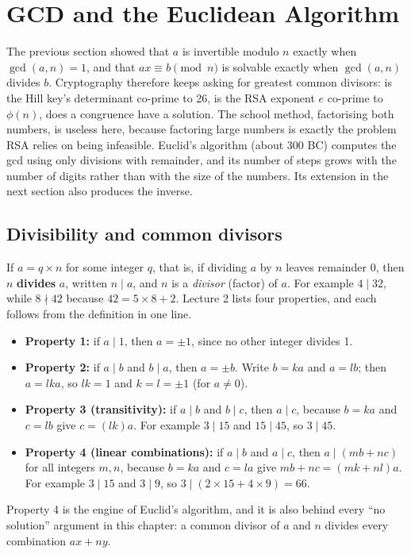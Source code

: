 \section{GCD and the Euclidean Algorithm}\label{sec:gcd}

The previous section showed that $a$ is invertible modulo $n$ exactly when $\gcd(a, n) = 1$, and that $ax \equiv b \pmod n$ is solvable exactly when $\gcd(a, n)$ divides $b$. Cryptography therefore keeps asking for greatest common divisors: is the Hill key's determinant co-prime to 26, is the RSA exponent $e$ co-prime to $\phi(n)$, does a congruence have a solution. The school method, factorising both numbers, is useless here, because factoring large numbers is exactly the problem RSA relies on being infeasible. Euclid's algorithm (about 300 BC) computes the gcd using only divisions with remainder, and its number of steps grows with the number of digits rather than with the size of the numbers. Its extension in the next section also produces the inverse.

\subsection{Divisibility and common divisors}
If $a = q \times n$ for some integer $q$, that is, if dividing $a$ by $n$ leaves remainder 0, then $n$ \textbf{divides} $a$, written $n \mid a$, and $n$ is a \emph{divisor} (factor) of $a$. For example $4 \mid 32$, while $8 \nmid 42$ because $42 = 5 \times 8 + 2$. Lecture 2 lists four properties, and each follows from the definition in one line.
\begin{itemize}[leftmargin=1.5em]
  \item \textbf{Property 1:} if $a \mid 1$, then $a = \pm 1$, since no other integer divides 1.
  \item \textbf{Property 2:} if $a \mid b$ and $b \mid a$, then $a = \pm b$. Write $b = ka$ and $a = lb$; then $a = lka$, so $lk = 1$ and $k = l = \pm 1$ (for $a \ne 0$).
  \item \textbf{Property 3 (transitivity):} if $a \mid b$ and $b \mid c$, then $a \mid c$, because $b = ka$ and $c = lb$ give $c = (lk)a$. For example $3 \mid 15$ and $15 \mid 45$, so $3 \mid 45$.
  \item \textbf{Property 4 (linear combinations):} if $a \mid b$ and $a \mid c$, then $a \mid (mb + nc)$ for all integers $m, n$, because $b = ka$ and $c = la$ give $mb + nc = (mk + nl)a$. For example $3 \mid 15$ and $3 \mid 9$, so $3 \mid (2 \times 15 + 4 \times 9) = 66$.
\end{itemize}
Property 4 is the engine of Euclid's algorithm, and it is also behind every ``no solution'' argument in this chapter: a common divisor of $a$ and $n$ divides every combination $ax + ny$.

